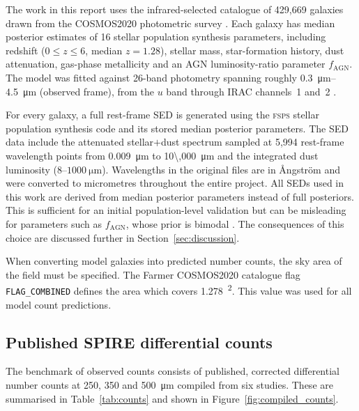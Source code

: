 \documentclass[12pt,a4paper]{article}
\begin{document}
The work in this report uses the infrared-selected \popcosmos{} catalogue of 429,669
galaxies drawn from the COSMOS2020 photometric survey
\citep{Thorp_2025_insights}. Each galaxy has
median posterior estimates of 16 stellar population synthesis parameters, including
redshift ($0 \leq z \leq 6$, median $z = 1.28$), stellar mass, star-formation history,
dust attenuation, gas-phase metallicity and an AGN luminosity-ratio parameter
$f_\mathrm{AGN}$. The model was fitted against 26-band photometry spanning roughly
\SIrange{0.3}{4.5}{\um} (observed frame), from the $u$ band through IRAC channels~1
and~2 \citep{Thorp_2025_insights}.

For every galaxy, a full rest-frame SED is generated using the \textsc{fsps} stellar
population synthesis code and its stored median posterior parameters. The SED data include
the attenuated stellar$+$dust spectrum sampled at 5,994 rest-frame wavelength points from
\SI{0.009}{\um} to \SI{10\,000}{\um} and the integrated dust luminosity
\LIR{} ($8$--$\SI{1000}{\um}$). Wavelengths in the original files are in \AA ngstr\"om
and were converted to micrometres throughout the entire project. All SEDs used in this
work are derived from median posterior parameters instead of full posteriors. This is
sufficient for an initial population-level validation but can be misleading for
parameters such as $f_\mathrm{AGN}$, whose prior is bimodal
\citep{Thorp_2025_insights}. The consequences of this choice are discussed further in
Section~\ref{sec:discussion}.

When converting model galaxies into predicted number counts, the sky area of
the field must be specified. The Farmer COSMOS2020 catalogue flag
\texttt{FLAG\_COMBINED} defines the area which covers
\SI{1.278}{\deg\squared}. This value was used for all model count predictions.

\subsection{Published SPIRE differential counts}
\label{sec:data:counts}

The benchmark of observed counts consists of published, corrected differential
number counts at 250, 350 and \SI{500}{\um} compiled from six studies. These are
summarised in Table~\ref{tab:counts} and shown in Figure~\ref{fig:compiled_counts}.
\end{document}
